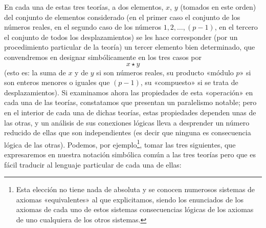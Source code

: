 \documentclass[a4paper, 12pt, draft]{article}
\begin{document}
En cada una de estas tres teorías, a dos elementos, $x$, $y$ (tomados en este orden) del conjunto de elementos considerado (en el primer caso el conjunto de los números reales, en el segundo caso de los números $1, 2,\dots, (p-1)$, en el tercero el conjunto de todos los desplazamientos) se les hace corresponder (por un procedimiento particular de la teoría) un tercer elemento bien determinado, que convendremos en designar simbólicamente en los tres casos por $$ x\star y $$ (esto es: la suma de $x$ y de $y$ si son números reales, su producto «módulo $p$» si son enteros menores o iguales que $(p-1)$, su «compuesto» si se trata de desplazamientos). Si examinamos ahora las propiedades de esta «operación» en cada una de las teorías, constatamos que presentan un paralelismo notable; pero en el interior de cada una de dichas teorías, estas propiedades dependen unas de las otras, y un análisis de sus conexiones lógicas lleva a desprender un número reducido de ellas que son independientes (es decir que ninguna es consecuencia lógica de las otras). Podemos, por ejemplo\footnote{Esta elección no tiene nada de absoluta y se conocen numerosos sistemas de axiomas «equivalentes» al que explicitamos, siendo los enunciados de los axiomas de cada uno de estos sistemas consecuencias lógicas de los axiomas de uno cualquiera de los otros sistemas.}, tomar las tres siguientes, que expresaremos en nuestra notación simbólica común a las tres teorías pero que es fácil traducir al lenguaje particular de cada una de ellas: 
\end{document}
